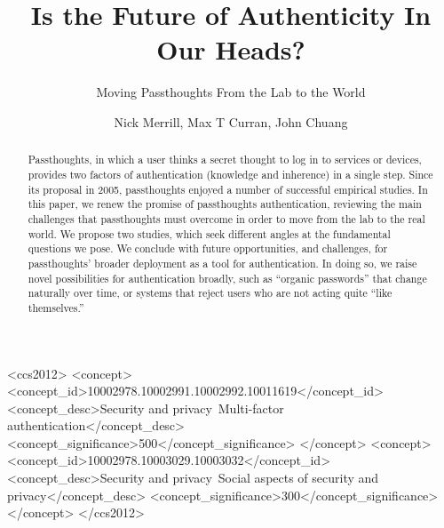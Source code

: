 \author{Nick Merrill, Max T Curran, John Chuang}


\title{Is the Future of Authenticity In Our Heads?}
\subtitle{Moving Passthoughts From the Lab to the World}

\begin{abstract}
Passthoughts, in which a user thinks a secret thought to log in to services or devices, provides two factors of authentication (knowledge and inherence) in a single step. Since its proposal in 2005, passthoughts enjoyed a number of successful empirical studies. In this paper, we renew the promise of passthoughts authentication, reviewing the main challenges that passthoughts must overcome in order to move from the lab to the real world. We propose two studies, which seek different angles at the fundamental questions we pose. We conclude with future opportunities, and challenges, for passthoughts’ broader deployment as a tool for authentication. In doing so, we raise novel possibilities for authentication broadly, such as ``organic passwords'' that change naturally over time, or systems that reject users who are not acting quite ``like themselves.''
\end{abstract}

%
% 
%
%
\begin{CCSXML}
<ccs2012>
<concept>
<concept_id>10002978.10002991.10002992.10011619</concept_id>
<concept_desc>Security and privacy~Multi-factor authentication</concept_desc>
<concept_significance>500</concept_significance>
</concept>
<concept>
<concept_id>10002978.10003029.10003032</concept_id>
<concept_desc>Security and privacy~Social aspects of security and privacy</concept_desc>
<concept_significance>300</concept_significance>
</concept>
</ccs2012>
\end{CCSXML}


